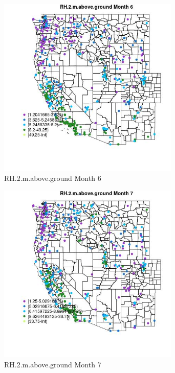 \clearpage 

\begin{figure} 
\centering  
\includegraphics[width=0.77\textwidth]{Code_Outputs/ML_input_report_ML_input_PM25_Step5_part_d_de_duplicated_aves_ML_input_MapObsMo6RH2maboveground.jpg} 
\caption{\label{fig:ML_input_report_ML_input_PM25_Step5_part_d_de_duplicated_aves_ML_inputMapObsMo6RH2maboveground}RH.2.m.above.ground Month 6} 
\end{figure} 
 

\begin{figure} 
\centering  
\includegraphics[width=0.77\textwidth]{Code_Outputs/ML_input_report_ML_input_PM25_Step5_part_d_de_duplicated_aves_ML_input_MapObsMo7RH2maboveground.jpg} 
\caption{\label{fig:ML_input_report_ML_input_PM25_Step5_part_d_de_duplicated_aves_ML_inputMapObsMo7RH2maboveground}RH.2.m.above.ground Month 7} 
\end{figure} 
 

